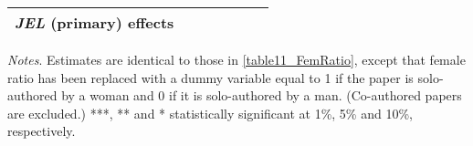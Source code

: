 \begin{table}
\begin{threeparttable}
\begin{tabular}{p{3.78cm}S@{}S@{}S@{}S@{}S@{}S@{}}
            \textit{JEL} (primary) effects&               &               &               &           {}   &           {}   &           {}   \\
            \bottomrule
        \end{tabular}
        \begin{tablenotes}
            \tiny
            \item \textit{Notes}. Estimates are identical to those in \autoref{table11_FemRatio}, except that female ratio has been replaced with a dummy variable equal to 1 if the paper is solo-authored by a woman and 0 if it is solo-authored by a man. (Co-authored papers are excluded.) ***, ** and * statistically significant at 1\%, 5\% and 10\%, respectively.
        \end{tablenotes}
    \end{threeparttable}
\end{table}